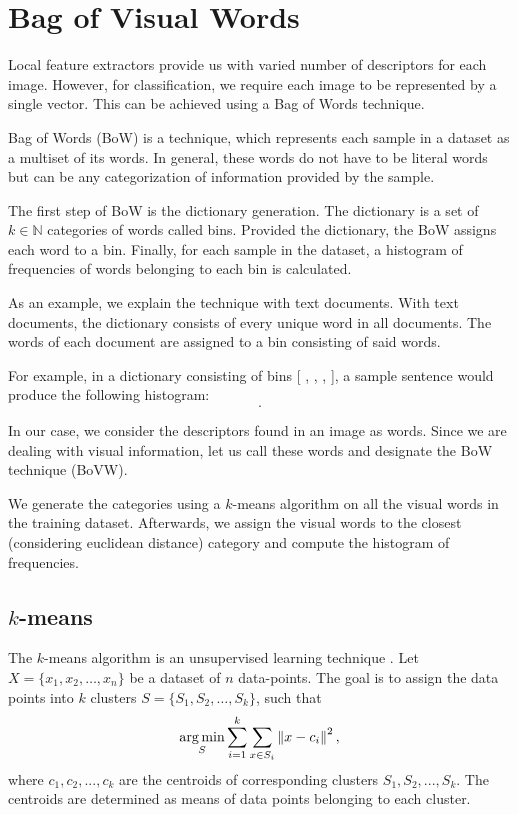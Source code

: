 \section{Bag of Visual Words}
Local feature extractors provide us with varied number of descriptors for each image. However, for classification, we require each image to be represented by a single vector. This can be achieved using a Bag of Words technique.

Bag of Words (BoW) is a technique, which represents each sample in a dataset as a multiset of its words. In general, these words do not have to be literal words but can be any categorization of information provided by the sample.

The first step of BoW is the dictionary generation. The dictionary is a set of $k \in \mathbb{N}$ categories of words called bins. Provided the dictionary, the BoW assigns each word to a bin. Finally, for each sample in the dataset, a histogram of frequencies of words belonging to each bin is calculated.

As an example, we explain the technique with text documents. With text documents, the dictionary consists of every unique word in all documents. The words of each document are assigned to a bin consisting of said words.

For example, in a dictionary consisting of bins [ , , ,  ], a sample sentence  would produce the following histogram:
\begin{equation}
    [2, 0, 1, 1].
\end{equation}

In our case, we consider the descriptors found in an image as words. Since we are dealing with visual information, let us call these words  and designate the BoW technique  (BoVW).

We generate the categories using a $k$-means algorithm on all the visual words in the training dataset. Afterwards, we assign the visual words to the closest (considering euclidean distance) category and compute the histogram of frequencies.

\subsection{$k$-means}
The $k$-means algorithm is an unsupervised learning technique \cite{macqueen1967}. Let $X=\{ x_1, x_2, \dots, x_n \}$ be a dataset of $n$ data-points. The goal is to assign the data points into $k$ clusters $S = \{ S_1, S_2, \dots, S_k \}$, such that
\begin{equation}
    \operatorname*{arg\,min}_S \sum_{i=1}^k \sum_{x\in S_i} \left\lVert x-c_i\right\rVert^2,
\end{equation}
where \(c_1, c_2, ..., c_k \) are the centroids of corresponding clusters \(S_1, S_2, ..., S_k \). The centroids are determined as means of data points belonging to each cluster.

